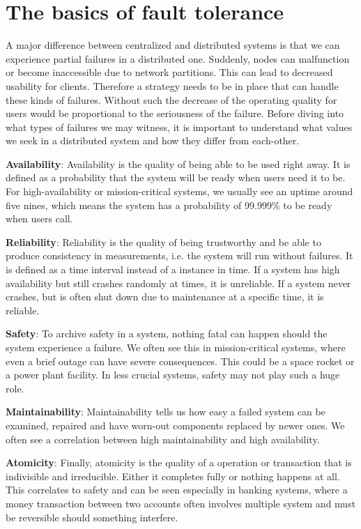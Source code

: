 \section{The basics of fault tolerance}

A major difference between centralized and distributed systems is that we can experience partial failures in a distributed one. Suddenly, nodes can malfunction or become inaccessible due to network partitions. This can lead to decreased usability for clients. Therefore a strategy needs to be in place that can handle these kinds of failures. Without such the decrease of the operating quality for users would be proportional to the seriousness of the failure. Before diving into what types of failures we may witness, it is important to understand what values we seek in a distributed system and how they differ from each-other.

\noindent \textbf{Availability}: Availability is the quality of being able to be used right away. It is defined as a probability that the system will be ready when users need it to be. For high-availability or mission-critical systems, we usually see an uptime around five nines, which means the system has a probability of 99.999\% to be ready when users call.

\noindent \textbf{Reliability}: Reliability is the quality of being trustworthy and be able to produce consistency in measurements, i.e. the system will run without failures. It is defined as a time interval instead of a instance in time. If a system has high availability but still crashes randomly at times, it is unreliable. If a system never crashes, but is often shut down due to maintenance at a specific time, it is reliable.

\noindent \textbf{Safety}: To archive safety in a system, nothing fatal can happen should the system experience a failure. We often see this in mission-critical systems, where even a brief outage can have severe consequences. This could be a space rocket or a power plant facility. In less crucial systems, safety may not play such a huge role.

\noindent \textbf{Maintainability}: Maintainability tells us how easy a failed system can be examined, repaired and have worn-out components replaced by newer ones. We often see a correlation between high maintainability and high availability. 

\noindent \textbf{Atomicity}: Finally, atomicity is the quality of a operation or transaction that is indivisible and irreducible. Either it completes fully or nothing happens at all. This correlates to safety and can be seen especially in banking systems, where a money transaction between two accounts often involves multiple system and must be reversible should something interfere.

